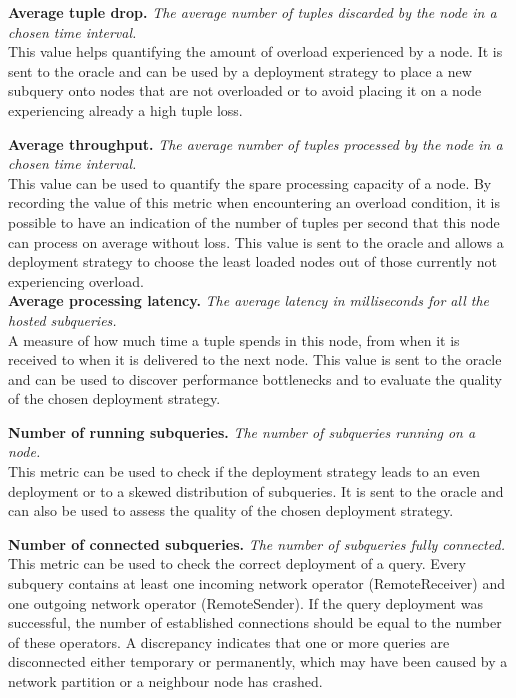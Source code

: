 \textbf{Average tuple drop.} \emph{The average number of tuples discarded by the node in a chosen time
interval.}\\
This value helps quantifying the amount of overload experienced by a node. It is sent to the
oracle and can be used by a deployment strategy to place a new subquery onto nodes that are not
overloaded or to avoid placing it on a node experiencing already a high tuple loss. 

\textbf{Average throughput.} \emph{The average number of tuples processed by the node in a
chosen time interval.}\\
This value can be used to quantify the spare processing capacity of a node. By
recording the value of this metric when encountering an overload condition, it is possible to have an
indication of the number of tuples per second that this node can process on average without loss. 
This value is sent to the oracle and allows a deployment strategy to choose the least loaded
nodes out of those currently not experiencing overload.\\

\textbf{Average processing latency.} \emph{The average latency in milliseconds for all the hosted
subqueries.}\\
A measure of how much time a tuple spends in this node, from when it is received to when it is delivered
to the next node. This value is sent to the oracle and can be used to discover performance bottlenecks
and to evaluate the quality of the chosen deployment strategy. 

\textbf{Number of running subqueries.} \emph{The number of subqueries running on a node.}\\
This metric can be used to check if the deployment strategy leads to an even
deployment or to a skewed distribution of subqueries. It is sent to the oracle and can also be used to
assess the quality of the chosen deployment strategy.

\textbf{Number of connected subqueries.} \emph{The number of subqueries fully connected.}\\ 
This metric can be used to check the correct deployment of a query.
Every subquery contains at least one incoming network operator (RemoteReceiver) and one outgoing network
operator (RemoteSender). If the query deployment was successful, the number of established connections
should be equal to the number of these operators. A discrepancy indicates that one or more queries are
disconnected either temporary or permanently, which may have been caused by a network partition or a
neighbour node has crashed.

